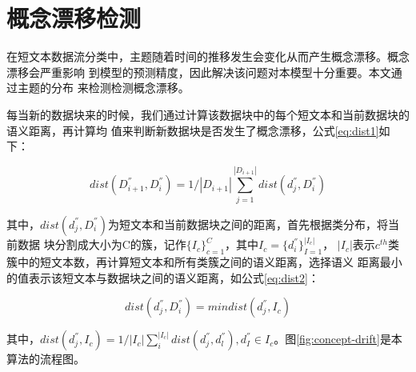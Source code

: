




\section{概念漂移检测}
在短文本数据流分类中，主题随着时间的推移发生会变化从而产生概念漂移。概念漂移会严重影响
到模型的预测精度，因此解决该问题对本模型十分重要。本文通过主题的分布
来检测检测概念漂移。


每当新的数据块来的时候，我们通过计算该数据块中的每个短文本和当前数据块的语义距离，再计算均
值来判断新数据块是否发生了概念漂移，公式\ref{eq:dist1}如下：

\begin{equation}
  \label{eq:dist1}
       dist(D_{i+1}^{''},D_{i}^{''})=1 / |D_{i+1}|\sum_{j=1}^{|D_{i+1}|}dist(d_j^{''},D_i^{''})
\end{equation}

其中，$dist(d_j^{''},D_i^{''})$为短文本和当前数据块之间的距离，首先根据类分布，将当前数据
块分割成大小为C的簇，记作$\{I_c\}_{c=1}^{C}$，其中$I_c=\{d_i^{''}\}_{I=1}^{|I_c|}$，
$|I_c|$表示$c^{th}$类簇中的短文本数，再计算短文本和所有类簇之间的语义距离，选择语义
距离最小的值表示该短文本与数据块之间的语义距离，如公式\ref{eq:dist2}：

\begin{equation}
  \label{eq:dist2}
  dist(d_j^{''}, D_i^{''})=min dist(d_j^{''},I_c)
\end{equation}

其中，$dist(d_j^{''},I_c)=1/|I_c|\sum_i^{|I_c|}dist(d_j^{''},d_l^{''}), d_I^{''} \in I_c $。图\ref{fig:concept-drift}是本算法的流程图。

